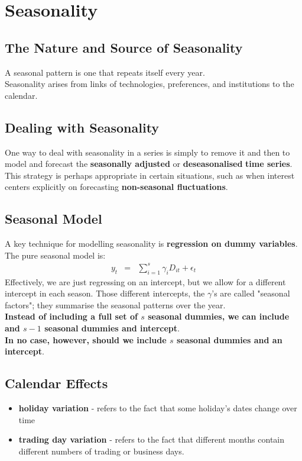 \chapter{Seasonality}

\section{The Nature and Source of Seasonality}
A seasonal pattern is one that repeats itself every year.\\
Seasonality arises from links of technologies, preferences, and institutions to the calendar.

\section{Dealing with Seasonality}
One way to deal with seasonality in a series is simply to remove it and then to model and forecast the \textbf{\color{red}seasonally adjusted} or \textbf{\color{red}deseasonalised} \textbf{\color{blue}time series}.\\
This strategy is perhaps appropriate in certain situations, such as when interest centers explicitly on forecasting \textbf{\color{ForestGreen}non-seasonal fluctuations}.


\section{Seasonal Model}
A key technique for modelling seasonality is \textbf{\color{blue}regression on dummy variables}.\\
The pure seasonal model is:
\begin{eqnarray}
	y_{t} &=& \sum_{i = 1}^{s}\gamma_{i}D_{it} + \epsilon_{t}
\end{eqnarray}
Effectively, we are just regressing on an intercept, but we allow for a different intercept in each season. Those different intercepts, the $\gamma$'s are called "seasonal factors"; they summarise the seasonal patterns over the year.\\
\textbf{\color{blue}Instead of including a full set of $s$ seasonal dummies, we can include and $s - 1$ seasonal dummies and intercept}.\\
\textbf{\color{ForestGreen}In no case, however, should we include $s$ seasonal dummies and an intercept}.

\section{Calendar Effects}
\begin{itemize}
	\item \textbf{\color{blue}holiday variation} - refers to the fact that some holiday's dates change over time
	\item \textbf{\color{blue}trading day variation} - refers to the fact that different months contain different numbers of trading or business days.
\end{itemize}